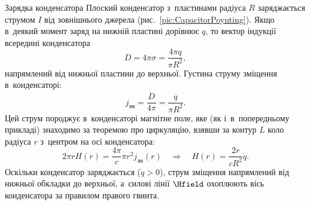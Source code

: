 \begin{Example}{Зарядка конденсатора}
	Плоский конденсатор з~пластинами радіуса $R$ заряджається струмом $I$ від зовнішнього
	джерела (рис.~\ref{pic:CapacitorPoynting}). Якщо в~деякий момент заряд на нижній
	пластині дорівнює $q$, то вектор індукції всередині конденсатора
	\begin{equation}\label{eq:CapacitorD}
		D = 4\pi\sigma = \frac{4\pi q}{\pi R^2},
	\end{equation}
	напрямлений від нижньої пластини до верхньої. Густина струму зміщення в~конденсаторі:
	\begin{equation*}
		j_\text{зм} = \frac{\dot D}{4\pi} = \frac{\dot q}{\pi R^2}.
	\end{equation*}
	Цей струм породжує в~конденсаторі магнітне поле, яке (як і~в~попередньому прикладі)
	знаходимо за теоремою про циркуляцію, взявши за контур $L$ коло радіуса $r$ з~центром
	на осі конденсатора:
	\begin{equation*}
		2\pi r H(r) = \frac{4\pi}{c}\pi r^2 j_\text{зм}(r) \quad\Rightarrow\quad H(r) = \frac{2r}{cR^2}\dot q.
	\end{equation*}
	Оскільки конденсатор заряджається ($\dot q>0$), струм зміщення напрямлений від нижньої обкладки до верхньої, а~силові лінії $\Hfield$ охоплюють вісь конденсатора за правилом правого гвинта.%

	\begin{center}%
	\end{center}


\end{Example}
